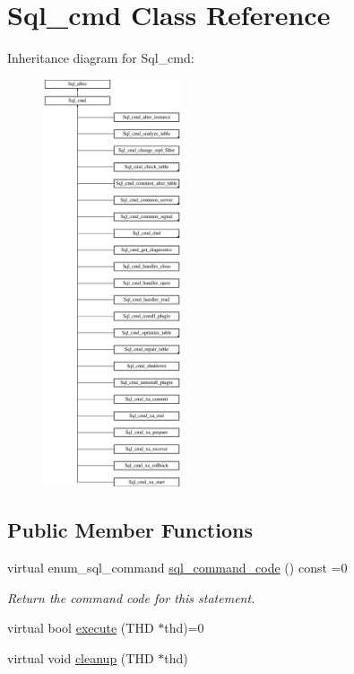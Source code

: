 \hypertarget{classSql__cmd}{}\section{Sql\+\_\+cmd Class Reference}
\label{classSql__cmd}
Inheritance diagram for Sql\+\_\+cmd\+:\begin{figure}[H]
\begin{center}
\leavevmode
\includegraphics[height=12.000000cm]{classSql__cmd}
\end{center}
\end{figure}
\subsection*{Public Member Functions}
\begin{DoxyCompactItemize}
\item 
\mbox{\label{classSql__cmd_ae58cec31333016fc94fb25c0d2f4ff01}} 
virtual enum\+\_\+sql\+\_\+command \mbox{\hyperlink{classSql__cmd_ae58cec31333016fc94fb25c0d2f4ff01}{sql\+\_\+command\+\_\+code}} () const =0
\begin{DoxyCompactList}\small\item\em Return the command code for this statement. \end{DoxyCompactList}\item 
virtual bool \mbox{\hyperlink{classSql__cmd_a213367b79b551296fbb7790f2a3732fb}{execute}} (T\+HD $\ast$thd)=0
\item 
virtual void \mbox{\hyperlink{classSql__cmd_a57dad9cab4d6349656cf38a03131b58a}{cleanup}} (T\+HD $\ast$thd)
\end{DoxyCompactItemize}
